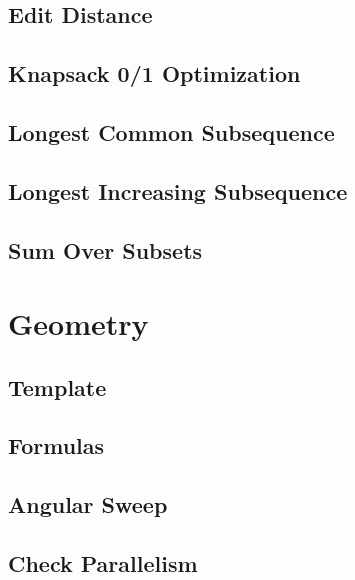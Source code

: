 \subsection{Edit Distance}
\raggedbottom
\hrulefill
\subsection{Knapsack 0/1 Optimization}
\raggedbottom
\hrulefill
\subsection{Longest Common Subsequence}
\raggedbottom
\hrulefill
\subsection{Longest Increasing Subsequence}
\raggedbottom
\hrulefill
\subsection{Sum Over Subsets}
\raggedbottom
\hrulefill

\section{Geometry}
\subsection{Template}
\raggedbottom
\hrulefill
\subsection{Formulas}
\raggedbottom
\hrulefill
\subsection{Angular Sweep}
\raggedbottom
\hrulefill
\subsection{Check Parallelism}
\raggedbottom
\hrulefill
